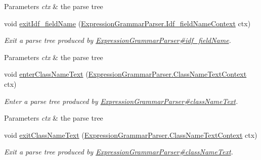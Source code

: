 \begin{DoxyCompactItemize}
\begin{DoxyCompactList}
\begin{DoxyParams}{Parameters}
{\em ctx} & the parse tree\\
\hline
\end{DoxyParams}
 \end{DoxyCompactList}\item 
void \hyperlink{classgov_1_1nasa_1_1jpf_1_1inspector_1_1server_1_1expression_1_1parser_1_1_expression_grammar_base_listener_a25ccdf0dff828753f8351fe695e0b5fd}{exit\+Idf\+\_\+field\+Name} (\hyperlink{classgov_1_1nasa_1_1jpf_1_1inspector_1_1server_1_1expression_1_1parser_1_1_expression_grammar_pad53202cd69742416986508e382be2265}{Expression\+Grammar\+Parser.\+Idf\+\_\+field\+Name\+Context} ctx)
\begin{DoxyCompactList}\small\item\em Exit a parse tree produced by \hyperlink{classgov_1_1nasa_1_1jpf_1_1inspector_1_1server_1_1expression_1_1parser_1_1_expression_grammar_parser_a6123d29ed4ca503a4952f04ea9e7a81f}{Expression\+Grammar\+Parser\#idf\+\_\+field\+Name}.


\begin{DoxyParams}{Parameters}
{\em ctx} & the parse tree\\
\hline
\end{DoxyParams}
 \end{DoxyCompactList}\item 
void \hyperlink{classgov_1_1nasa_1_1jpf_1_1inspector_1_1server_1_1expression_1_1parser_1_1_expression_grammar_base_listener_afb4596464c62320536dbc6199a859ad0}{enter\+Class\+Name\+Text} (\hyperlink{classgov_1_1nasa_1_1jpf_1_1inspector_1_1server_1_1expression_1_1parser_1_1_expression_grammar_pa73f78f15ab35f00cdc76079d9a864524}{Expression\+Grammar\+Parser.\+Class\+Name\+Text\+Context} ctx)
\begin{DoxyCompactList}\small\item\em Enter a parse tree produced by \hyperlink{classgov_1_1nasa_1_1jpf_1_1inspector_1_1server_1_1expression_1_1parser_1_1_expression_grammar_parser_a146c2558746623f23b5705d8e32eaded}{Expression\+Grammar\+Parser\#class\+Name\+Text}.


\begin{DoxyParams}{Parameters}
{\em ctx} & the parse tree\\
\hline
\end{DoxyParams}
 \end{DoxyCompactList}\item 
void \hyperlink{classgov_1_1nasa_1_1jpf_1_1inspector_1_1server_1_1expression_1_1parser_1_1_expression_grammar_base_listener_aa31d3c72aaeb4627a1440fe820494378}{exit\+Class\+Name\+Text} (\hyperlink{classgov_1_1nasa_1_1jpf_1_1inspector_1_1server_1_1expression_1_1parser_1_1_expression_grammar_pa73f78f15ab35f00cdc76079d9a864524}{Expression\+Grammar\+Parser.\+Class\+Name\+Text\+Context} ctx)
\begin{DoxyCompactList}\small\item\em Exit a parse tree produced by \hyperlink{classgov_1_1nasa_1_1jpf_1_1inspector_1_1server_1_1expression_1_1parser_1_1_expression_grammar_parser_a146c2558746623f23b5705d8e32eaded}{Expression\+Grammar\+Parser\#class\+Name\+Text}.



\end{DoxyCompactList}
\end{DoxyCompactItemize}
